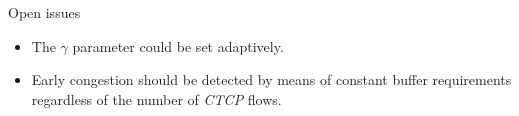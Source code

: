 \begin{frame}{Open issues}
        \begin{itemize}
		\item The $\gamma$ parameter could be set adaptively.
		\item Early congestion should be detected 
		      by means of constant buffer requirements 
		      regardless of the number of \textit{CTCP} flows.
        \end{itemize}
\end{frame}

